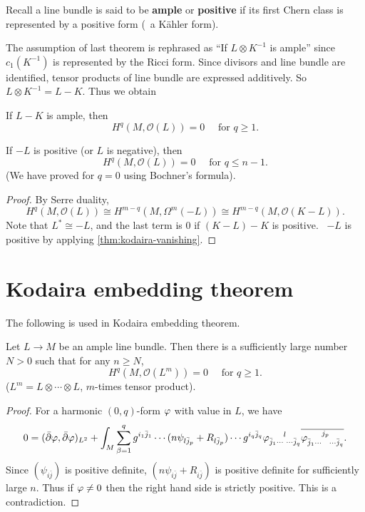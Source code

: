 \documentclass[12pt]{article}
\begin{document}
Recall a line bundle is said to be \textbf{ample} or \textbf{positive} if its
first Chern class is represented by a positive form (\ie\ a Kähler form).

The assumption of last theorem is rephrased as ``If \(L\otimes K^{-1}\) is
ample'' since \(c_1(K^{-1})\) is represented by the Ricci form. Since divisors
and line bundle are identified, tensor products of line bundle are expressed
additively. So \(L\otimes K^{-1}=L-K\). Thus we obtain
\begin{theorem}\label{thm:kodaira-vanishing}
  If \(L-K\) is ample, then \[
    H^q(M,\mathcal{O}(L))=0\quad\text{ for }q\ge 1
  .\] 
\end{theorem}
\begin{theorem}
  If \(-L\) is positive (or \(L\) is negative), then \[
    H^q(M,\mathcal{O}(L))=0\quad\text{ for }q\le n-1
  .\] (We have proved for \(q=0\) using Bochner's formula).
\end{theorem}
\begin{proof}
  By Serre duality, \[
    H^q(M,\mathcal{O}(L))\cong H^{m-q}(M,\Omega^m(-L))
    \cong H^{m-q}(M,\mathcal{O}(K-L))
  .\] Note that \(L^*\cong -L\), and the last term is \(0\) if \((K-L)-K\) is
  positive. \ie\ \(-L\) is positive by applying \cref{thm:kodaira-vanishing}.
\end{proof}

\section{Kodaira embedding theorem}
The following is used in Kodaira embedding theorem.
\begin{theorem}
  Let \(L\to M\) be an ample line bundle. Then there is a sufficiently large
  number \(N>0\) such that for any \(n\ge N\), \[
    H^q(M,\mathcal{O}(L^m))=0\quad\text{ for }q\ge 1
  .\] (\(L^m=L\otimes\cdots\otimes L\), \(m\)-times tensor product).
\end{theorem}
\begin{proof}
  For a harmonic \((0,q)\)-form \(\varphi\) with value in \(L\), we have \[
    0=(\bar{\partial}\vphi,\bar{\partial}\vphi)_{L^2}
    +\int_{M}\sum_{\beta=1}^{q}g^{i_1\bar{j}_1}\cdots (n\psi_{l\bar{j}_p}
    +R_{l\bar{j}_p})\cdots g^{i_q\bar{j}_q}
    \vphi\indices{_{\bar{j}_1\cdots}^l_{\cdots \bar{j}_q}}
    \overline{\vphi\indices{_{\bar{j}_1\cdots}^{j_p}_{\cdots \bar{j}_q}}}
  .\] Since \((\psi_{i\bar{j}})\) is positive definite, \((n\psi_{i\bar{j}}
  +R_{i\bar{j}})\) is positive definite for sufficiently large \(n\). Thus if
  \(\varphi\neq 0\) then the right hand side is strictly positive. This is a
  contradiction.
\end{proof}
\end{document}

